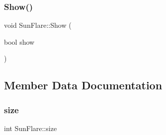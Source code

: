 \hypertarget{class_sun_flare_a849cba0217528b018b5de15069a095c5}{}\label{class_sun_flare_a849cba0217528b018b5de15069a095c5} 
\subsubsection{\texorpdfstring{Show()}{Show()}}
{\footnotesize\ttfamily void Sun\+Flare\+::\+Show (\begin{DoxyParamCaption}\item[{bool}]{show }\end{DoxyParamCaption})}



\subsection{Member Data Documentation}
\hypertarget{class_sun_flare_a82fd97f7487781241075f8ea874a93ca}{}\label{class_sun_flare_a82fd97f7487781241075f8ea874a93ca} 
\subsubsection{\texorpdfstring{size}{size}}
{\footnotesize\ttfamily int Sun\+Flare\+::size}

